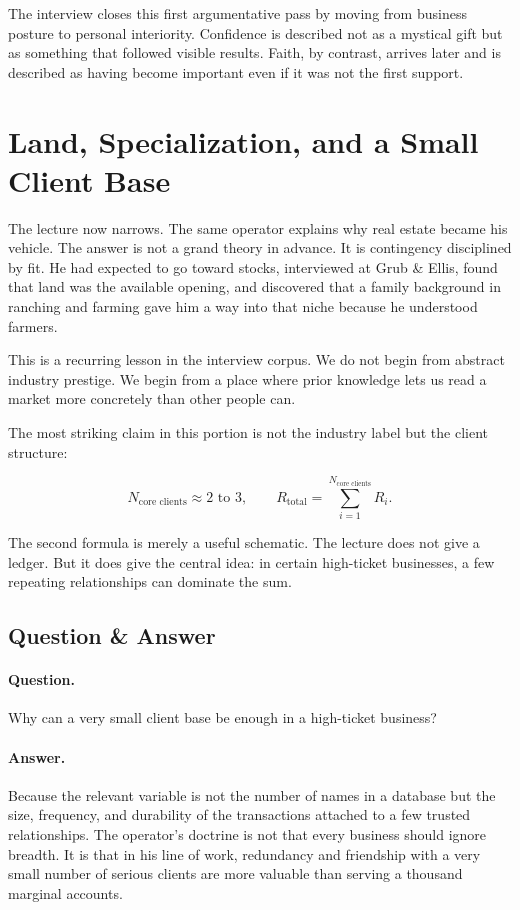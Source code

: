 The interview closes this first argumentative pass by moving from business posture to personal interiority. Confidence is described not as a mystical gift but as something that followed visible results. Faith, by contrast, arrives later and is described as having become important even if it was not the first support.

\section{Land, Specialization, and a Small Client Base}

The lecture now narrows. The same operator explains why real estate became his vehicle. The answer is not a grand theory in advance. It is contingency disciplined by fit. He had expected to go toward stocks, interviewed at Grub \& Ellis, found that land was the available opening, and discovered that a family background in ranching and farming gave him a way into that niche because he understood farmers.

This is a recurring lesson in the interview corpus. We do not begin from abstract industry prestige. We begin from a place where prior knowledge lets us read a market more concretely than other people can.

The most striking claim in this portion is not the industry label but the client structure:

\begin{equation}
N_{\text{core clients}}\approx 2\text{ to }3,
\qquad
R_{\text{total}}=\sum_{i=1}^{N_{\text{core clients}}} R_i.
\end{equation}

The second formula is merely a useful schematic. The lecture does not give a ledger. But it does give the central idea: in certain high-ticket businesses, a few repeating relationships can dominate the sum.

\subsection{Question \& Answer}

\paragraph{Question.} Why can a very small client base be enough in a high-ticket business?

\paragraph{Answer.} Because the relevant variable is not the number of names in a database but the size, frequency, and durability of the transactions attached to a few trusted relationships. The operator's doctrine is not that every business should ignore breadth. It is that in his line of work, redundancy and friendship with a very small number of serious clients are more valuable than serving a thousand marginal accounts.

